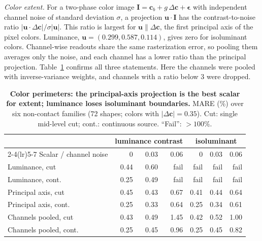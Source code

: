\documentclass[11pt,a4paper]{article}
\begin{document}
\emph{Color extent.} For a two-phase color image $\bm I=\bm c_b+g\,\Delta\bm c+\bm\epsilon$ with independent channel noise of standard deviation $\sigma$, a projection $\bm u\cdot\bm I$ has the contrast-to-noise ratio $|\bm u\cdot\Delta\bm c|/\sigma|\bm u|$. This ratio is largest for $\bm u\parallel\Delta\bm c$, the first principal axis of the pixel colors. Luminance, $\bm u=(0.299,0.587,0.114)$, gives zero for isoluminant colors. Channel-wise readouts share the same rasterization error, so pooling them averages only the noise, and each channel has a lower ratio than the principal projection. Table~\ref{tab:colorext} confirms all three statements. Here the channels were pooled with inverse-variance weights, and channels with a ratio below 3 were dropped.

\begin{table}[h]
\centering\caption{\textbf{Color perimeters: the principal-axis projection is the best scalar for extent; luminance loses isoluminant boundaries.} MARE (\%) over six non-contact families (72 shapes; colors with $|\Delta\bm c|=0.35$). Cut: single mid-level cut; cont.: continuous source. ``Fail'': $>100\%$.}\label{tab:colorext}
\small\begin{tabular}{@{}lrrrrrr@{}}\toprule
 & \multicolumn{3}{c}{luminance contrast} & \multicolumn{3}{c}{isoluminant}\\\cmidrule(lr){2-4}\cmidrule(lr){5-7}
Scalar / channel noise & 0 & 0.03 & 0.06 & 0 & 0.03 & 0.06\\\midrule
Luminance, cut & 0.44 & 0.60 & fail & fail & fail & fail\\
Luminance, cont. & 0.25 & 0.49 & fail & fail & fail & fail\\
Principal axis, cut & 0.45 & 0.43 & 0.67 & 0.41 & 0.44 & 0.64\\
Principal axis, cont. & 0.25 & 0.33 & 0.64 & 0.25 & 0.34 & 0.61\\
Channels pooled, cut & 0.43 & 0.49 & 1.45 & 0.42 & 0.52 & 1.00\\
Channels pooled, cont. & 0.25 & 0.45 & 0.96 & 0.25 & 0.45 & 0.82\\\bottomrule
\end{tabular}
\end{table}
\end{document}
